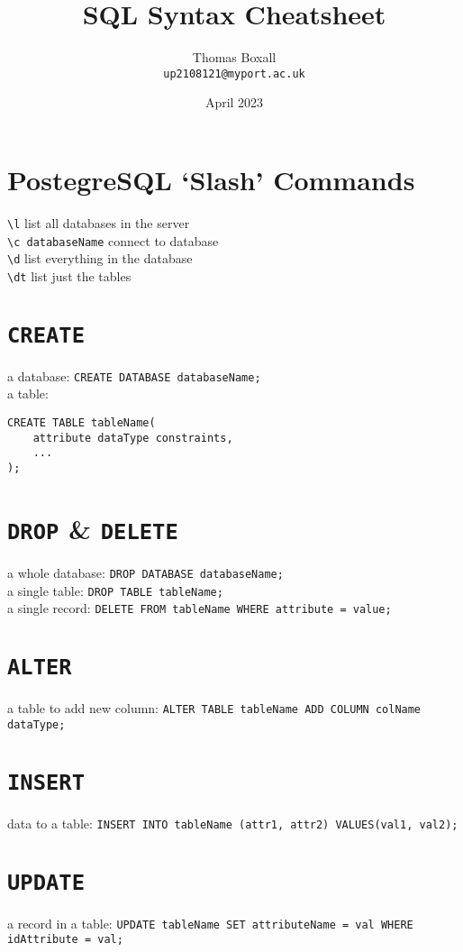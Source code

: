 \documentclass[a4paper,11pt]{article}
\title{SQL Syntax Cheatsheet}
\author{Thomas Boxall\\ \texttt{up2108121@myport.ac.uk}}
\date{April 2023}
\begin{document}
\maketitle
\thispagestyle{fancy}

\section{PostegreSQL `Slash' Commands}
\verb|\l| list all databases in the server\\
\verb|\c databaseName| connect to database\\
\verb|\d| list everything in the database\\
\verb|\dt| list just the tables

\section{\texttt{CREATE}}
a database: \verb|CREATE DATABASE databaseName;|\\
a table: 
\begin{verbatim}
CREATE TABLE tableName(
    attribute dataType constraints,
    ...
);
\end{verbatim}

\section{\texttt{DROP} \& \texttt{DELETE}}
a whole database: \verb|DROP DATABASE databaseName;|\\
a single table: \verb|DROP TABLE tableName;|\\
a single record: \verb|DELETE FROM tableName WHERE attribute = value;|

\section{\texttt{ALTER}}
a table to add new column: \verb|ALTER TABLE tableName ADD COLUMN colName dataType;|

\section{\texttt{INSERT}}
data to a table: \verb|INSERT INTO tableName (attr1, attr2) VALUES(val1, val2);|

\section{\texttt{UPDATE}}
a record in a table: \verb|UPDATE tableName SET attributeName = val WHERE idAttribute = val;|
\end{document}
